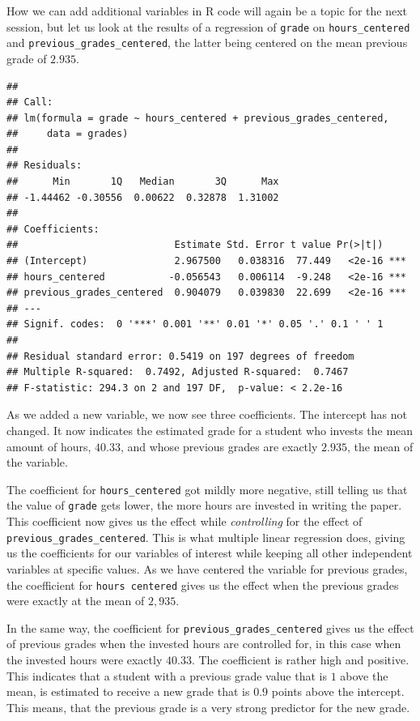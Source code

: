 \documentclass[
]{book}
\begin{document}
How we can add additional variables in R code will again be a topic for the next
session, but let us look at the results of a regression of \texttt{grade} on
\texttt{hours\_centered} and \texttt{previous\_grades\_centered}, the latter being centered on the
mean previous grade of \(2.935\).

\begin{verbatim}
## 
## Call:
## lm(formula = grade ~ hours_centered + previous_grades_centered, 
##     data = grades)
## 
## Residuals:
##      Min       1Q   Median       3Q      Max 
## -1.44462 -0.30556  0.00622  0.32878  1.31002 
## 
## Coefficients:
##                           Estimate Std. Error t value Pr(>|t|)    
## (Intercept)               2.967500   0.038316  77.449   <2e-16 ***
## hours_centered           -0.056543   0.006114  -9.248   <2e-16 ***
## previous_grades_centered  0.904079   0.039830  22.699   <2e-16 ***
## ---
## Signif. codes:  0 '***' 0.001 '**' 0.01 '*' 0.05 '.' 0.1 ' ' 1
## 
## Residual standard error: 0.5419 on 197 degrees of freedom
## Multiple R-squared:  0.7492, Adjusted R-squared:  0.7467 
## F-statistic: 294.3 on 2 and 197 DF,  p-value: < 2.2e-16
\end{verbatim}

As we added a new variable, we now see three coefficients.
The intercept has not changed. It now indicates the estimated grade for a
student who invests the mean amount of hours, \(40.33\), and whose previous grades
are exactly \(2.935\), the mean of the variable.

The coefficient for \texttt{hours\_centered} got mildly more negative, still telling us
that the value of \texttt{grade} gets lower, the more hours are invested in writing the
paper. This coefficient now gives us the effect while \emph{controlling} for the
effect of \texttt{previous\_grades\_centered}. This is what multiple linear regression
does, giving us the coefficients for our variables of interest while keeping all
other independent variables at specific values. As we have centered the variable
for previous grades, the coefficient for \texttt{hours\ centered} gives us the effect
when the previous grades were exactly at the mean of \(2,935\).

In the same way, the coefficient for \texttt{previous\_grades\_centered} gives us the
effect of previous grades when the invested hours are controlled for, in this
case when the invested hours were exactly \(40.33\). The coefficient is rather
high and positive. This indicates that a student with a previous grade value
that is \(1\) above the mean, is estimated to receive a new grade that is \(0.9\)
points above the intercept. This means, that the previous grade is a very strong
predictor for the new grade.
\end{document}
